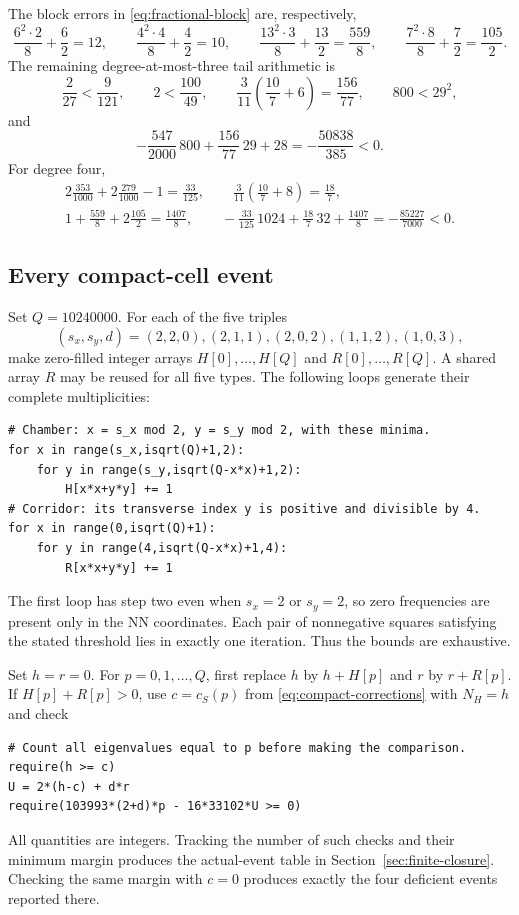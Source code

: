 \documentclass[11pt,reqno]{amsart}
\numberwithin{equation}{section}
\begin{document}
The block errors in \eqref{eq:fractional-block} are, respectively,
\[
 \frac{6^2\cdot2}{8}+\frac62=12,\qquad
 \frac{4^2\cdot4}{8}+\frac42=10,\qquad
 \frac{13^2\cdot3}{8}+\frac{13}{2}=\frac{559}{8},\qquad
 \frac{7^2\cdot8}{8}+\frac72=\frac{105}{2}.
\]
The remaining degree-at-most-three tail arithmetic is
\[
 \frac2{27}<\frac9{121},\qquad 2<\frac{100}{49},\qquad
 \frac3{11}\left(\frac{10}{7}+6\right)=\frac{156}{77},
 \qquad 800<29^2,
\]
and
\[
 -\frac{547}{2000}\,800+\frac{156}{77}\,29+28
 =-\frac{50838}{385}<0.
\]
For degree four,
\[
 \begin{gathered}
 2\frac{353}{1000}+2\frac{279}{1000}-1=\frac{33}{125},\qquad
 \frac3{11}\left(\frac{10}{7}+8\right)=\frac{18}{7},\\
 1+\frac{559}{8}+2\frac{105}{2}=\frac{1407}{8},\qquad
 -\frac{33}{125}\,1024+\frac{18}{7}\,32+\frac{1407}{8}
 =-\frac{85227}{7000}<0.
 \end{gathered}
\]

\subsection{Every compact-cell event}

Set $Q=10240000$. For each of the five triples
\[
 (s_x,s_y,d)=(2,2,0),(2,1,1),(2,0,2),(1,1,2),(1,0,3),
\]
make zero-filled integer arrays $H[0],\ldots,H[Q]$ and
$R[0],\ldots,R[Q]$. A shared array $R$ may be reused for all five
types. The following loops generate their complete multiplicities:
\begin{verbatim}
# Chamber: x = s_x mod 2, y = s_y mod 2, with these minima.
for x in range(s_x,isqrt(Q)+1,2):
    for y in range(s_y,isqrt(Q-x*x)+1,2):
        H[x*x+y*y] += 1
# Corridor: its transverse index y is positive and divisible by 4.
for x in range(0,isqrt(Q)+1):
    for y in range(4,isqrt(Q-x*x)+1,4):
        R[x*x+y*y] += 1
\end{verbatim}
The first loop has step two even when $s_x=2$ or $s_y=2$, so zero
frequencies are present only in the NN coordinates. Each pair of
nonnegative squares satisfying the stated threshold lies in exactly
one iteration. Thus the bounds are exhaustive.

Set $h=r=0$. For $p=0,1,\ldots,Q$, first replace
$h$ by $h+H[p]$ and $r$ by $r+R[p]$. If $H[p]+R[p]>0$, use
$c=c_S(p)$ from \eqref{eq:compact-corrections} with $N_H=h$ and check
\begin{verbatim}
# Count all eigenvalues equal to p before making the comparison.
require(h >= c)
U = 2*(h-c) + d*r
require(103993*(2+d)*p - 16*33102*U >= 0)
\end{verbatim}
All quantities are integers. Tracking the number of such checks and
their minimum margin produces the actual-event table in
Section~\ref{sec:finite-closure}. Checking the same margin with $c=0$
produces exactly the four deficient events reported there.
\end{document}
